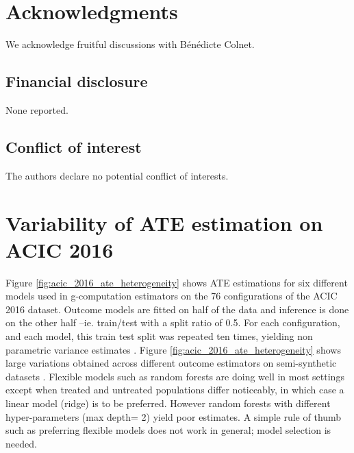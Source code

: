 \documentclass[11pt]{article}
\let\cite=\supercite
\begin{document}
\section*{Acknowledgments}

We acknowledge fruitful discussions with Bénédicte Colnet.

\subsection*{Financial disclosure}

None reported.

\subsection*{Conflict of interest}

The authors declare no potential conflict of interests.

\printbibliography

\clearpage

\onecolumn

\appendix
\setcounter{secnumdepth}{3}


\section{Variability of ATE estimation on ACIC
  2016}\label{apd:toy_example:acic_2016_ate_variability}

Figure \ref{fig:acic_2016_ate_heterogeneity} shows ATE estimations for six
different models used in g-computation estimators on the 76 configurations of
the ACIC 2016 dataset. Outcome models are fitted on half of the data and
inference is done on the other half --ie. train/test with a split ratio of 0.5.
For each configuration, and each model, this train test split was repeated ten
times, yielding non parametric variance estimates
\cite{bouthillier_accounting_2021}. Figure \ref{fig:acic_2016_ate_heterogeneity}
shows large variations obtained across different outcome estimators on
semi-synthetic datasets \cite{dorie_automated_2019}. Flexible models such as
random forests are doing well in most settings except when treated and untreated
populations differ noticeably, in which case a linear model (ridge) is to be
preferred. However random forests with different hyper-parameters (max depth= 2)
yield poor estimates. A simple rule of thumb such as preferring flexible models
does not work in general; model selection is needed.
\end{document}
